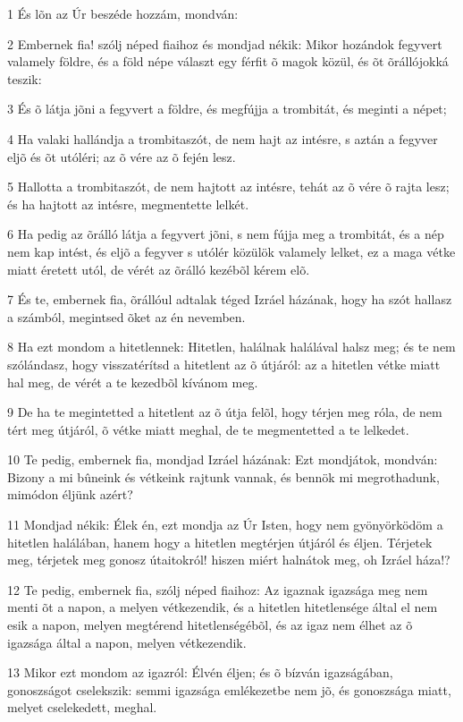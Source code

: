 \par 1 És lõn az Úr beszéde hozzám, mondván:
\par 2 Embernek fia! szólj néped fiaihoz és mondjad nékik: Mikor hozándok fegyvert valamely földre, és a föld népe választ egy férfit õ magok közül, és õt õrállójokká teszik:
\par 3 És õ látja jõni a fegyvert a földre, és megfújja a trombitát, és meginti a népet;
\par 4 Ha valaki hallándja a trombitaszót, de nem hajt az intésre, s aztán a fegyver eljõ és õt utóléri; az õ vére az õ fején lesz.
\par 5 Hallotta a trombitaszót, de nem hajtott az intésre, tehát az õ vére õ rajta lesz; és ha hajtott az intésre, megmentette lelkét.
\par 6 Ha pedig az õrálló látja a fegyvert jõni, s nem fújja meg a trombitát, és a nép nem kap intést, és eljõ a fegyver s utólér közülök valamely lelket, ez a maga vétke miatt éretett utól, de vérét az õrálló kezébõl kérem elõ.
\par 7 És te, embernek fia, õrállóul adtalak téged Izráel házának, hogy ha szót hallasz a számból, megintsed õket az én nevemben.
\par 8 Ha ezt mondom a hitetlennek: Hitetlen, halálnak halálával halsz meg; és te nem szólándasz, hogy visszatérítsd a hitetlent az õ útjáról: az a hitetlen vétke miatt hal meg, de vérét a te kezedbõl kívánom meg.
\par 9 De ha te megintetted a hitetlent az õ útja felõl, hogy térjen meg róla, de nem tért meg útjáról, õ vétke miatt meghal, de te megmentetted a te lelkedet.
\par 10 Te pedig, embernek fia, mondjad Izráel házának: Ezt mondjátok, mondván: Bizony a mi bûneink és vétkeink rajtunk vannak, és bennök mi megrothadunk, mimódon éljünk azért?
\par 11 Mondjad nékik: Élek én, ezt mondja az Úr Isten, hogy nem gyönyörködöm a hitetlen halálában, hanem hogy a hitetlen megtérjen útjáról és éljen. Térjetek meg, térjetek meg gonosz útaitokról! hiszen miért  halnátok meg, oh Izráel háza!?
\par 12 Te pedig, embernek fia, szólj néped fiaihoz: Az igaznak igazsága meg nem menti õt a napon, a melyen vétkezendik, és a hitetlen hitetlensége által el nem esik a napon, melyen megtérend hitetlenségébõl, és az igaz nem élhet az õ igazsága által a napon, melyen vétkezendik.
\par 13 Mikor ezt mondom az igazról: Élvén éljen; és õ bízván igazságában, gonoszságot cselekszik: semmi igazsága emlékezetbe nem jõ, és gonoszsága miatt, melyet cselekedett, meghal.
